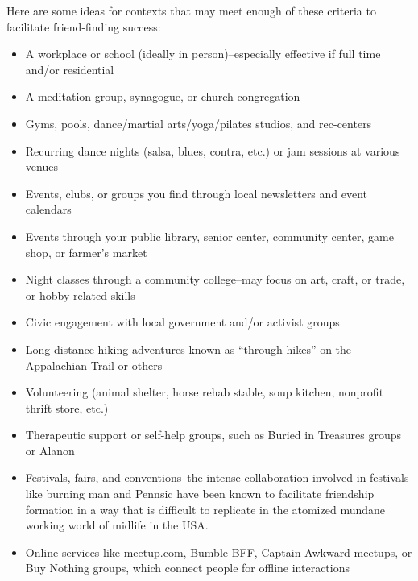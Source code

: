 \documentclass[12pt,letterpaper]{book}
\begin{document}
Here are some ideas for contexts that may meet enough of these criteria to facilitate friend-finding success:
\begin{itemize}
	\item A workplace or school (ideally in person)–especially effective if full time and/or residential
	\item A meditation group, synagogue, or church congregation
	\item Gyms, pools, dance/martial arts/yoga/pilates studios, and rec-centers
	\item Recurring dance nights (salsa, blues, contra, etc.) or jam sessions at various venues
	\item Events, clubs, or groups you find through local newsletters and event calendars
	\item Events through your public library, senior center, community center, game shop, or farmer's market
	\item Night classes through a community college–may focus on art, craft, or trade, or hobby related skills
	\item Civic engagement with local government and/or activist groups
	\item Long distance hiking adventures known as “through hikes” on the Appalachian Trail or others
	\item Volunteering (animal shelter, horse rehab stable, soup kitchen, nonprofit thrift store, etc.)
	\item Therapeutic support or self-help groups, such as Buried in Treasures groups or Alanon
	\item Festivals, fairs, and conventions–the intense collaboration involved in festivals like burning man \cite{st2018civilised} and Pennsic have been known to facilitate friendship formation in a way that is difficult to replicate in the atomized mundane working world of midlife in the USA.
	\item Online services like meetup.com, Bumble BFF, Captain Awkward meetups, or Buy Nothing groups, which connect people for offline interactions
\end{itemize}
\end{document}
